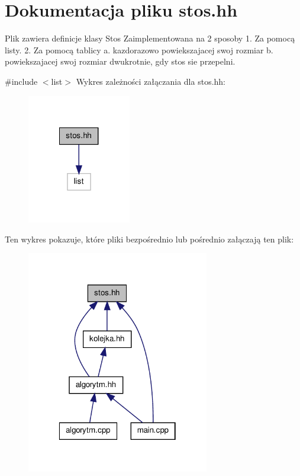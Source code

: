 \hypertarget{stos_8hh}{\section{\-Dokumentacja pliku stos.\-hh}
\label{stos_8hh}
}


\-Plik zawiera definicje klasy {\ttfamily \-Stos} \-Zaimplementowana na 2 sposoby 1. \-Za pomocą listy. 2. \-Za pomocą tablicy a. kazdorazowo powiekszajacej swoj rozmiar b. powiekszajacej swoj rozmiar dwukrotnie, gdy stos sie przepelni.  


{\ttfamily \#include $<$list$>$}\*
\-Wykres zależności załączania dla stos.\-hh\-:\nopagebreak
\begin{figure}[H]
\begin{center}
\leavevmode
\includegraphics[width=128pt]{stos_8hh__incl}
\end{center}
\end{figure}
\-Ten wykres pokazuje, które pliki bezpośrednio lub pośrednio załączają ten plik\-:\nopagebreak
\begin{figure}[H]
\begin{center}
\leavevmode
\includegraphics[width=226pt]{stos_8hh__dep__incl}
\end{center}
\end{figure}
